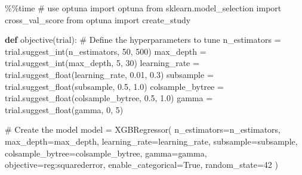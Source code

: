 \documentclass[
  letterpaper,
  DIV=11,
  numbers=noendperiod]{scrreprt}
\newenvironment{Shaded}{\begin{snugshade}}{\end{snugshade}}
\newcommand{\CommentTok}[1]{\textcolor[rgb]{0.37,0.37,0.37}{#1}}
\newcommand{\DecValTok}[1]{\textcolor[rgb]{0.68,0.00,0.00}{#1}}
\newcommand{\FloatTok}[1]{\textcolor[rgb]{0.68,0.00,0.00}{#1}}
\newcommand{\ImportTok}[1]{\textcolor[rgb]{0.00,0.46,0.62}{#1}}
\newcommand{\KeywordTok}[1]{\textcolor[rgb]{0.00,0.23,0.31}{\textbf{#1}}}
\newcommand{\NormalTok}[1]{\textcolor[rgb]{0.00,0.23,0.31}{#1}}
\newcommand{\OperatorTok}[1]{\textcolor[rgb]{0.37,0.37,0.37}{#1}}
\newcommand{\StringTok}[1]{\textcolor[rgb]{0.13,0.47,0.30}{#1}}
\newcommand{\VariableTok}[1]{\textcolor[rgb]{0.07,0.07,0.07}{#1}}
\begin{document}
\begin{Shaded}
\begin{Highlighting}[]
\OperatorTok{\%\%}\NormalTok{time}
\CommentTok{\# use optuna}
\ImportTok{import}\NormalTok{ optuna}
\ImportTok{from}\NormalTok{ sklearn.model\_selection }\ImportTok{import}\NormalTok{ cross\_val\_score}
\ImportTok{from}\NormalTok{ optuna }\ImportTok{import}\NormalTok{ create\_study}

\KeywordTok{def}\NormalTok{ objective(trial):}
    \CommentTok{\# Define the hyperparameters to tune}
\NormalTok{    n\_estimators }\OperatorTok{=}\NormalTok{ trial.suggest\_int(}\StringTok{\textquotesingle{}n\_estimators\textquotesingle{}}\NormalTok{, }\DecValTok{50}\NormalTok{, }\DecValTok{500}\NormalTok{)}
\NormalTok{    max\_depth }\OperatorTok{=}\NormalTok{ trial.suggest\_int(}\StringTok{\textquotesingle{}max\_depth\textquotesingle{}}\NormalTok{, }\DecValTok{5}\NormalTok{, }\DecValTok{30}\NormalTok{)}
\NormalTok{    learning\_rate }\OperatorTok{=}\NormalTok{ trial.suggest\_float(}\StringTok{\textquotesingle{}learning\_rate\textquotesingle{}}\NormalTok{, }\FloatTok{0.01}\NormalTok{, }\FloatTok{0.3}\NormalTok{)}
\NormalTok{    subsample }\OperatorTok{=}\NormalTok{ trial.suggest\_float(}\StringTok{\textquotesingle{}subsample\textquotesingle{}}\NormalTok{, }\FloatTok{0.5}\NormalTok{, }\FloatTok{1.0}\NormalTok{)}
\NormalTok{    colsample\_bytree }\OperatorTok{=}\NormalTok{ trial.suggest\_float(}\StringTok{\textquotesingle{}colsample\_bytree\textquotesingle{}}\NormalTok{, }\FloatTok{0.5}\NormalTok{, }\FloatTok{1.0}\NormalTok{)}
\NormalTok{    gamma }\OperatorTok{=}\NormalTok{ trial.suggest\_float(}\StringTok{\textquotesingle{}gamma\textquotesingle{}}\NormalTok{, }\DecValTok{0}\NormalTok{, }\DecValTok{5}\NormalTok{)}

    \CommentTok{\# Create the model}
\NormalTok{    model }\OperatorTok{=}\NormalTok{ XGBRegressor(}
\NormalTok{        n\_estimators}\OperatorTok{=}\NormalTok{n\_estimators,}
\NormalTok{        max\_depth}\OperatorTok{=}\NormalTok{max\_depth,}
\NormalTok{        learning\_rate}\OperatorTok{=}\NormalTok{learning\_rate,}
\NormalTok{        subsample}\OperatorTok{=}\NormalTok{subsample,}
\NormalTok{        colsample\_bytree}\OperatorTok{=}\NormalTok{colsample\_bytree,}
\NormalTok{        gamma}\OperatorTok{=}\NormalTok{gamma,}
\NormalTok{        objective}\OperatorTok{=}\StringTok{\textquotesingle{}reg:squarederror\textquotesingle{}}\NormalTok{,}
\NormalTok{        enable\_categorical}\OperatorTok{=}\VariableTok{True}\NormalTok{,}
\NormalTok{        random\_state}\OperatorTok{=}\DecValTok{42}
\NormalTok{    )}


\end{Highlighting}
\end{Shaded}
\end{document}
